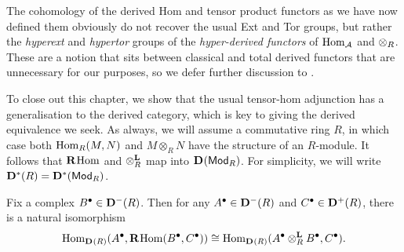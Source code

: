 \begin{remark}
  The cohomology of the derived Hom and tensor product functors as we
  have now defined them obviously do not recover the usual Ext and
  Tor groups, but rather the \emph{hyperext} and \emph{hypertor}
  groups of the \emph{hyper-derived functors} of $\Hom_{\abcat{A}}$
  and $\tensor_R$.
  These are a notion that sits between classical and total derived
  functors that are unnecessary for our purposes, so we defer further
  discussion to \cite[Chapter~5]{weibel}.
\end{remark}

To close out this chapter, we show that the usual tensor-hom
adjunction has a generalisation to the derived category, which is key
to giving the derived equivalence we seek.
As always, we will assume a commutative ring $R$, in which case both
$\Hom_R(M, N)$ and $M \otimes_R N$ have the structure of an $R$-module.
It follows that $\derhom$ and $\dertensorsymb_R$ map into $\dercat{\Mod{R}}$.
For simplicity, we will write $\dercat[*]{R} = \dercat[*]{\Mod{R}}$.

\begin{theorem}
  Fix a complex $\cochaincomp{B} \in \dercat[-]{R}$.
  Then for any $\cochaincomp{A} \in \dercat[-]{R}$ and
  $\cochaincomp{C} \in \dercat[+]{R}$, there is a natural isomorphism
  \[
    \Hom_{\dercat{R}}(\cochaincomp{A}, \derhom(\cochaincomp{B},
    \cochaincomp{C}))
    \cong
    \Hom_{\dercat{R}}(\dertensor{R}{\cochaincomp{A}}{\cochaincomp{B}},
    \cochaincomp{C}).
  \]
  \vspace{-24pt}
\end{theorem}

